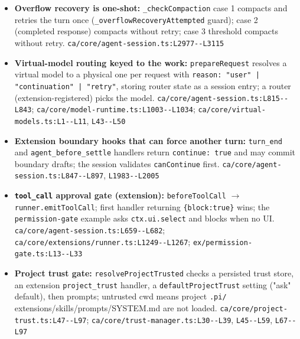 \begin{itemize}
\item \textbf{Overflow recovery is one-shot:} \texttt{\_\allowbreak{}checkCompaction} case 1 compacts and retries the turn once (\texttt{\_\allowbreak{}overflowRecoveryAttempted} guard); case 2 (completed response) compacts without retry; case 3 threshold compacts without retry. \texttt{ca/\allowbreak{}core/\allowbreak{}agent-\allowbreak{}session.\allowbreak{}ts:\allowbreak{}L2977-\allowbreak{}-\allowbreak{}L3115}
\item \textbf{Virtual-model routing keyed to the work:} \texttt{prepareRequest} resolves a virtual model to a physical one per request with \texttt{reason:\allowbreak{} "user" | "continuation" | "retry"}, storing router state as a session entry; a router (extension-registered) picks the model. \texttt{ca/\allowbreak{}core/\allowbreak{}agent-\allowbreak{}session.\allowbreak{}ts:\allowbreak{}L815-\allowbreak{}-\allowbreak{}L843}; \texttt{ca/\allowbreak{}core/\allowbreak{}model-\allowbreak{}runtime.\allowbreak{}ts:\allowbreak{}L1003-\allowbreak{}-\allowbreak{}L1034}; \texttt{ca/\allowbreak{}core/\allowbreak{}virtual-\allowbreak{}models.\allowbreak{}ts:\allowbreak{}L1-\allowbreak{}-\allowbreak{}L11}, \texttt{L43-\allowbreak{}-\allowbreak{}L50}
\item \textbf{Extension boundary hooks that can force another turn:} \texttt{turn\_\allowbreak{}end} and \texttt{agent\_\allowbreak{}before\_\allowbreak{}settle} handlers return \texttt{continue:\allowbreak{} true} and may commit boundary drafts; the session validates \texttt{canContinue} first. \texttt{ca/\allowbreak{}core/\allowbreak{}agent-\allowbreak{}session.\allowbreak{}ts:\allowbreak{}L847-\allowbreak{}-\allowbreak{}L897}, \texttt{L1983-\allowbreak{}-\allowbreak{}L2005}
\item \textbf{\texttt{tool\_\allowbreak{}call} approval gate (extension):} \texttt{beforeToolCall} $\rightarrow$ \texttt{runner.\allowbreak{}emitToolCall}; first handler returning \texttt{\{block:\allowbreak{}true\}} wins; the \texttt{permission-\allowbreak{}gate} example asks \texttt{ctx.\allowbreak{}ui.\allowbreak{}select} and blocks when no UI. \texttt{ca/\allowbreak{}core/\allowbreak{}agent-\allowbreak{}session.\allowbreak{}ts:\allowbreak{}L659-\allowbreak{}-\allowbreak{}L682}; \texttt{ca/\allowbreak{}core/\allowbreak{}extensions/\allowbreak{}runner.\allowbreak{}ts:\allowbreak{}L1249-\allowbreak{}-\allowbreak{}L1267}; \texttt{ex/\allowbreak{}permission-\allowbreak{}gate.\allowbreak{}ts:\allowbreak{}L13-\allowbreak{}-\allowbreak{}L33}
\item \textbf{Project trust gate:} \texttt{resolveProjectTrusted} checks a persisted trust store, an extension \texttt{project\_\allowbreak{}trust} handler, a \texttt{defaultProjectTrust} setting ("ask" default), then prompts; untrusted cwd means project \texttt{.\allowbreak{}pi/\allowbreak{}} extensions/skills/prompts/SYSTEM.md are not loaded. \texttt{ca/\allowbreak{}core/\allowbreak{}project-\allowbreak{}trust.\allowbreak{}ts:\allowbreak{}L47-\allowbreak{}-\allowbreak{}L97}; \texttt{ca/\allowbreak{}core/\allowbreak{}trust-\allowbreak{}manager.\allowbreak{}ts:\allowbreak{}L30-\allowbreak{}-\allowbreak{}L39}, \texttt{L45-\allowbreak{}-\allowbreak{}L59}, \texttt{L67-\allowbreak{}-\allowbreak{}L97}

\end{itemize}
